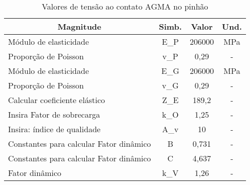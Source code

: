 \begin{table}[]
\centering
\caption{\label{tab:4} Valores de tensão ao contato AGMA no pinhão}
\hline
\begin{tabular}{lccc}
\multicolumn{1}{c}{\textbf{Magnitude}}                                                                                       & \textbf{Simb.} & \textbf{Valor} & \textbf{Und.} \\ \hline
Módulo de elasticidade                                                                                                       & E_P             & 206000         & MPa           \\
Proporção de Poisson                                                                                                         & v_P             & 0,29           & -             \\
Módulo de elasticidade                                                                                                       & E_G             & 206000         & MPa           \\
Proporção de Poisson                                                                                                         & v_G             & 0,29           & -             \\
Calcular coeficiente elástico                                                                                                & Z_E             & 189,2          & -             \\
Insira Fator de sobrecarga                                                                                                   & k_O             & 1,25           & -             \\
Insira: índice de qualidade                                                                                                  & A_v             & 10             & -             \\
Constantes para calcular Fator dinâmico                                                                                      & B              & 0,731          & -             \\
Constantes para calcular Fator dinâmico                                                                                      & C              & 4,637          & -             \\
Fator dinâmico                                                                                                               & k_V             & 1,26           & -             \\

\end{tabular}
\end{table}
